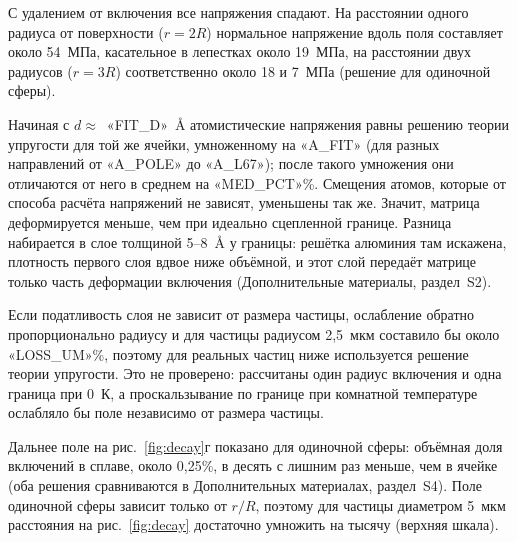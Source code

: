 \documentclass[11pt,a4paper]{article}
\begin{document}
С удалением от включения все напряжения спадают. На расстоянии одного
радиуса от поверхности ($r=2R$) нормальное напряжение вдоль поля
составляет около 54~МПа, касательное в лепестках около 19~МПа,
на расстоянии двух радиусов ($r=3R$) соответственно около 18 и 7~МПа
(решение для одиночной сферы).

Начиная с $d\approx$~«FIT_D»~\AA{} атомистические напряжения равны
решению теории упругости для той же ячейки, умноженному на «A_FIT»
(для разных направлений от «A_POLE» до «A_L67»); после такого умножения
они отличаются от него в среднем на «MED_PCT»\%. Смещения атомов, которые
от способа расчёта напряжений не зависят, уменьшены так же. Значит,
матрица деформируется меньше, чем при идеально сцепленной границе.
Разница набирается в слое толщиной 5--8~\AA{} у границы: решётка алюминия
там искажена, плотность первого слоя вдвое ниже объёмной, и этот слой
передаёт матрице только часть деформации включения (Дополнительные
материалы, раздел~S2).

Если податливость слоя не зависит от размера частицы, ослабление обратно
пропорционально радиусу и для частицы радиусом 2{,}5~мкм составило бы
около «LOSS_UM»\%, поэтому для реальных частиц ниже используется решение
теории упругости. Это не проверено: рассчитаны один радиус включения
и одна граница при 0~К, а проскальзывание по границе при комнатной
температуре ослабляло бы поле независимо от размера частицы.

Дальнее поле на рис.~\ref{fig:decay}г показано для одиночной сферы:
объёмная доля включений в сплаве, около 0{,}25\%, в десять с лишним раз
меньше, чем в ячейке (оба решения сравниваются в Дополнительных
материалах, раздел~S4). Поле одиночной сферы зависит только от $r/R$,
поэтому для частицы диаметром 5~мкм расстояния на рис.~\ref{fig:decay}
достаточно умножить на тысячу (верхняя шкала).
\end{document}
